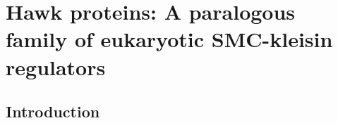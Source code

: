 \documentclass[a4paper,11pt,twoside,openright]{book}
\begin{document}
\chapter{Hawk proteins: A paralogous family of eukaryotic SMC-kleisin regulators}
\section{Introduction}
\blindtext
\end{document}
